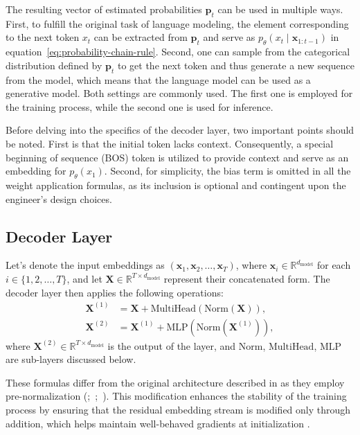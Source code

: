 The resulting vector of estimated probabilities \(\mathbf{p}_t\) can be used in multiple ways. First, to fulfill the original task of language modeling, the element corresponding to the next token \(x_t\) can be extracted from \(\mathbf{p}_t\) and serve as \(p_{\theta}(x_t \mid \bm{x}_{1:t-1})\) in equation~\ref{eq:probability-chain-rule}. Second, one can sample from the categorical distribution defined by \(\mathbf{p}_t\) to get the next token and thus generate a new sequence from the model, which means that the language model can be used as a generative model. Both settings are commonly used. The first one is employed for the training process, while the second one is used for inference.

Before delving into the specifics of the decoder layer, two important points should be noted. First is that the initial token lacks context. Consequently, a special beginning of sequence (BOS) token is utilized to provide context and serve as an embedding for \(p_\theta(x_1)\). Second, for simplicity, the bias term is omitted in all the weight application formulas, as its inclusion is optional and contingent upon the engineer's design choices.

\subsection{Decoder Layer}

Let's denote the input embeddings as \((\mathbf{x}_1, \mathbf{x}_2, \ldots, \mathbf{x}_{T})\), where \(\mathbf{x}_i \in \mathbb{R}^{d_{\mathrm{model}}}\) for each \(i \in \{1, 2, \ldots, T\}\), and let \(\mathbf{X} \in \mathbb{R}^{T \times d_{\mathrm{model}}}\) represent their concatenated form. The decoder layer then applies the following operations:
\begin{align}
    \mathbf{X}^{(1)} &= \mathbf{X} + \mathrm{MultiHead}(\mathrm{Norm}(\mathbf{X})), \\
    \mathbf{X}^{(2)} &= \mathbf{X}^{(1)} + \mathrm{MLP}(\mathrm{Norm}(\mathbf{X}^{(1)})),
\end{align}
where \(\mathbf{X}^{(2)} \in \mathbb{R}^{T \times d_{\mathrm{model}}}\) is the output of the layer, and \(\mathrm{Norm}\), \(\mathrm{MultiHead}\), \(\mathrm{MLP}\) are sub-layers discussed below.

These formulas differ from the original architecture described in \citet{vaswani2017} as they employ pre-normalization (\cite{baevski2019};~\cite{child2019};~\cite{wang2019}). This modification enhances the stability of the training process by ensuring that the residual embedding stream is modified only through addition, which helps maintain well-behaved gradients at initialization \parencite{xiong2020}.


